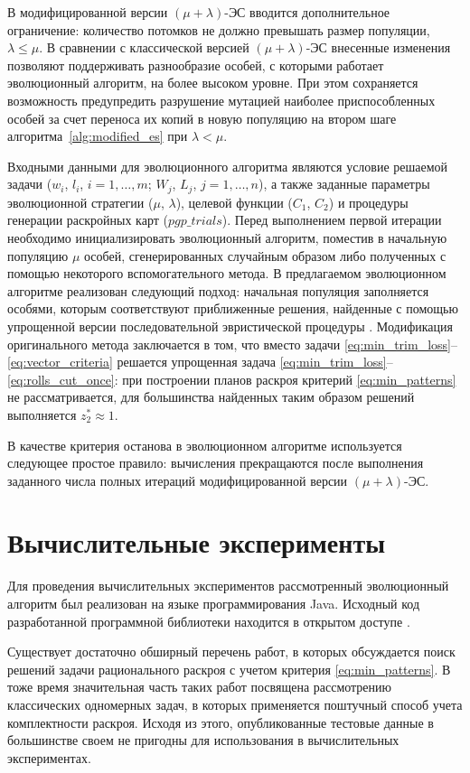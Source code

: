 \documentclass[12pt]{article}
\begin{document}
В модифицированной версии $(\mu + \lambda)$-ЭС вводится дополнительное 
ограничение: количество потомков не должно превышать размер популяции, 
$\lambda \leq \mu$. В сравнении с классической версией $(\mu + \lambda)$-ЭС 
внесенные изменения позволяют поддерживать разнообразие особей, с которыми 
работает эволюционный алгоритм, на более высоком уровне. При этом сохраняется 
возможность предупредить разрушение мутацией наиболее приспособленных особей 
за счет переноса их копий в новую популяцию на втором шаге 
алгоритма~\ref{alg:modified_es}
при $\lambda<\mu$.

Входными данными для эволюционного алгоритма являются условие решаемой задачи 
($w_i$, $l_i$, $i=1,\ldots,m$; $W_j$, $L_j$, $j=1,\ldots,n$), а также заданные 
параметры эволюционной стратегии ($\mu$, $\lambda$), целевой функции 
($C_1$, $C_2$) и процедуры генерации раскройных карт ($pgp\_trials$). Перед 
выполнением первой итерации необходимо инициализировать эволюционный алгоритм, 
поместив в начальную популяцию $\mu$ особей, сгенерированных случайным образом 
либо полученных с помощью некоторого вспомогательного метода. В предлагаемом 
эволюционном алгоритме реализован следующий подход: начальная популяция 
заполняется особями, которым соответствуют приближенные решения, найденные 
с помощью упрощенной версии последовательной эвристической процедуры 
\cite{haessler88}. 
Модификация оригинального метода 
\cite{haessler88} 
заключается в том, что вместо задачи 
\eqref{eq:min_trim_loss}--\eqref{eq:vector_criteria} 
решается упрощенная задача 
\eqref{eq:min_trim_loss}--\eqref{eq:rolls_cut_once}: 
при построении планов раскроя 
критерий 
\eqref{eq:min_patterns} 
не рассматривается, для большинства найденных таким образом 
решений выполняется $z_2^* \approx 1$.

В качестве критерия останова в эволюционном алгоритме используется следующее 
простое правило: вычисления прекращаются после выполнения заданного числа 
полных итераций модифицированной версии $(\mu + \lambda)$-ЭС.


\section{Вычислительные эксперименты}

Для проведения вычислительных экспериментов рассмотренный эволюционный 
алгоритм был реализован на языке программирования Java. Исходный код 
разработанной программной библиотеки находится в открытом доступе
\cite{github}.

Существует достаточно обширный перечень работ, в которых обсуждается поиск 
решений задачи рационального раскроя с учетом критерия 
\eqref{eq:min_patterns}. 
В тоже время 
значительная часть таких работ посвящена рассмотрению классических одномерных 
задач, в которых применяется поштучный способ учета комплектности раскроя. 
Исходя из этого, опубликованные тестовые данные в большинстве своем не 
пригодны для использования в вычислительных экспериментах.
\end{document}
